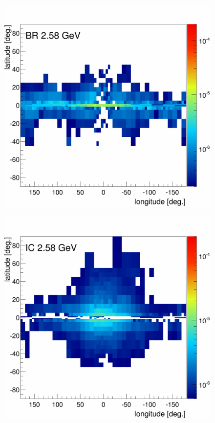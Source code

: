 \begin{figure}[h]
  \centering
  \begin{minipage}[h]{0.45\textwidth}
  	\centering
	\includegraphics[width=1.\linewidth]{pic/results/MCRonly_BR_fluxE12_skymap.png}
  	\label{fig:MCRonly_skymap_BR}
  \end{minipage}
  \hfill
  \begin{minipage}[h]{0.45\textwidth}
  	\centering
	\includegraphics[width=1.\linewidth]{pic/results/MCRonly_IC_fluxE12_skymap.png}

\end{minipage}
\end{figure}

